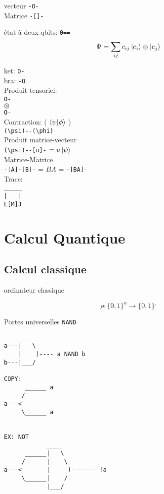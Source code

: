 \begin{tcolorbox}[title=Aparté notation tensorielle]

vecteur \verb|-O-|\\
Matrice \verb|-[]-|
	 
état à deux qbits: \verb|0==|
$$\Psi = \sum_{ij} c_{ij} \ket{e_{i}} \otimes\ket{e_j }$$  

 
ket: \verb|O-|\\
bra: \verb|-O|
\\

Produit tensoriel:\\
\verb|O-|\\
$ \otimes$\\
\verb|O-|\\

Contraction: ( $\bra{\psi}\ket{\phi}$  )\\

\verb|(\psi)--(\phi)|\\

Produit matrice-vecteur\\

\verb|(\psi)--[u]-| $= u \ket{\psi}$\\ 

Matrice-Matrice\\

\verb|-[A]-[B]-| = $BA$ = \verb|-[BA]-|\\ 


Trace:\\
\verb|_____|\\
\verb/|   |/\\
\verb|L[M]J|

\end{tcolorbox}

\section{Calcul Quantique}

\subsection{Calcul classique}

ordinateur classique

$$\rho: \{ 0,1 \}^n \to \{ 0,1 \}^,$$ 

Portes universelles
\verb|NAND|

\begin{verbatim}
    ____
a---|   \
    |    )---- a NAND b
b---|___/

COPY:
      ______ a
     /
a---<
     \______ a 


EX: NOT
            ____
      ______|   \
     /      |    \
a---<       |     )------- !a
     \______|    /
            |___/

\end{verbatim}


